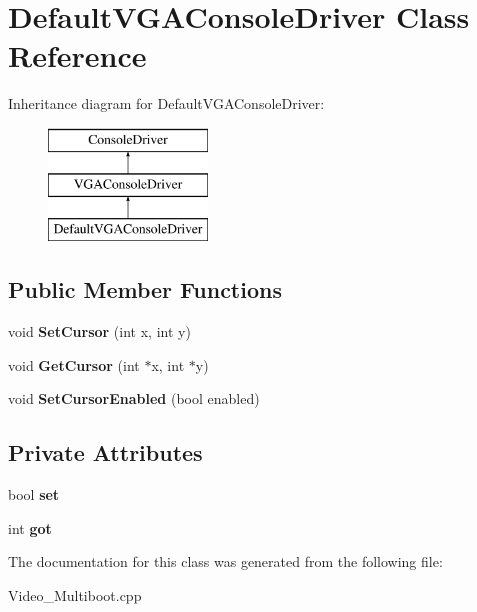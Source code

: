 \hypertarget{class_default_v_g_a_console_driver}{}\section{Default\+V\+G\+A\+Console\+Driver Class Reference}
\label{class_default_v_g_a_console_driver}
Inheritance diagram for Default\+V\+G\+A\+Console\+Driver\+:\begin{figure}[H]
\begin{center}
\leavevmode
\includegraphics[height=3.000000cm]{class_default_v_g_a_console_driver}
\end{center}
\end{figure}
\subsection*{Public Member Functions}
\begin{DoxyCompactItemize}
\item 
\mbox{\label{class_default_v_g_a_console_driver_a3d64c219ba74aaf8c488d4c2c5fef810}} 
void {\bfseries Set\+Cursor} (int x, int y)
\item 
\mbox{\label{class_default_v_g_a_console_driver_a3aef71265888b16365571d7ab741721a}} 
void {\bfseries Get\+Cursor} (int $\ast$x, int $\ast$y)
\item 
\mbox{\label{class_default_v_g_a_console_driver_a8e51ae9b29d13477075669d4f90cd053}} 
void {\bfseries Set\+Cursor\+Enabled} (bool enabled)
\end{DoxyCompactItemize}
\subsection*{Private Attributes}
\begin{DoxyCompactItemize}
\item 
\mbox{\label{class_default_v_g_a_console_driver_a3005e5cf0d599a5ff0eec440c60d81e0}} 
bool {\bfseries set}
\item 
\mbox{\label{class_default_v_g_a_console_driver_ab7cdc0053a6a7be8618622b9a871e496}} 
int {\bfseries got}
\end{DoxyCompactItemize}


The documentation for this class was generated from the following file\+:\begin{DoxyCompactItemize}
\item 
Video\+\_\+\+Multiboot.\+cpp\end{DoxyCompactItemize}
